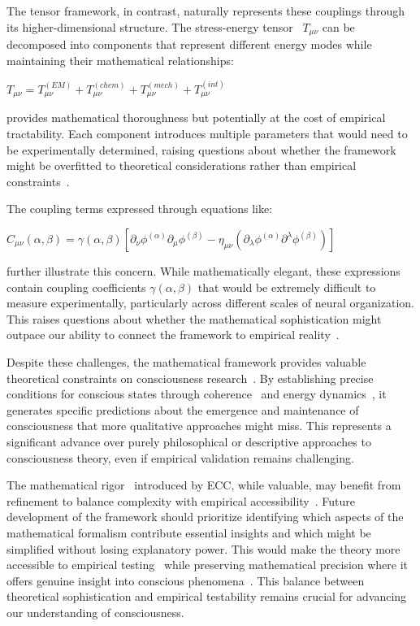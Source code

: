The tensor framework, in contrast, naturally represents these couplings through its higher-dimensional structure. The stress-energy tensor~ $T_{\mu\nu}$ can be decomposed into components that represent different energy modes while maintaining their mathematical relationships:

$T_{\mu\nu} = T^{(EM)}_{\mu\nu} + T^{(chem)}_{\mu\nu} + T^{(mech)}_{\mu\nu} + T^{(int)}_{\mu\nu}$

provides mathematical thoroughness but potentially at the cost of empirical tractability. Each component introduces multiple parameters that would need to be experimentally determined, raising questions about whether the framework might be overfitted to theoretical considerations rather than empirical constraints~\cite{chalmers2010character, koch2019feeling}.

The coupling terms expressed through equations like:

$C_{\mu\nu}(\alpha,\beta) = \gamma(\alpha,\beta)[\partial_\nu\phi^{(\alpha)}\partial_\mu\phi^{(\beta)} - \eta_{\mu\nu}(\partial_\lambda\phi^{(\alpha)}\partial^\lambda\phi^{(\beta)})]$

further illustrate this concern. While mathematically elegant, these expressions contain coupling coefficients $\gamma(\alpha,\beta)$ that would be extremely difficult to measure experimentally, particularly across different scales of neural organization. This raises questions about whether the mathematical sophistication might outpace our ability to connect the framework to empirical reality~\cite{seth2021being, thompson2014waking}.

Despite these challenges, the mathematical framework provides valuable theoretical constraints on consciousness research~\cite{koch2019feeling, varela2016embodied}. By establishing precise conditions for conscious states through coherence~ and energy dynamics~, it generates specific predictions about the emergence and maintenance of consciousness that more qualitative approaches might miss. This represents a significant advance over purely philosophical or descriptive approaches to consciousness theory, even if empirical validation remains challenging.

The mathematical rigor~ introduced by ECC, while valuable, may benefit from refinement to balance complexity with empirical accessibility~\cite{chalmers2010character, pinotsis2023vivo}. Future development of the framework should prioritize identifying which aspects of the mathematical formalism contribute essential insights and which might be simplified without losing explanatory power. This would make the theory more accessible to empirical testing~ while preserving mathematical precision where it offers genuine insight into conscious phenomena~\cite{seth2021being, bosl2025dynamical}. This balance between theoretical sophistication and empirical testability remains crucial for advancing our understanding of consciousness.


